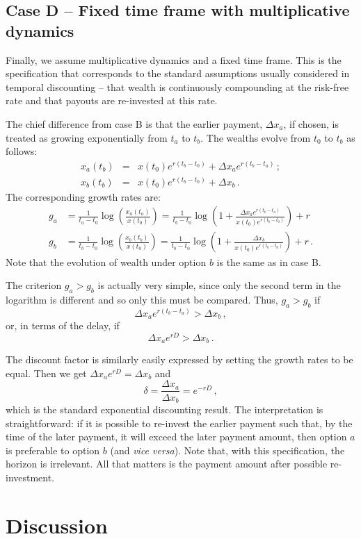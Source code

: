 \documentclass[11pt]{article}
\newcommand{\be}{\begin{equation}}
\newcommand{\ee}{\end{equation}}
\newcommand{\bea}{\begin{eqnarray}}
\newcommand{\eea}{\end{eqnarray}}
\newcommand{\Dx}{\Delta x}
\newcommand{\del}{D}
\numberwithin{equation}{section}
\begin{document}
\subsection{Case D -- Fixed time frame with multiplicative dynamics}\label{sec:case_D}

Finally, we assume multiplicative dynamics and a fixed time frame. This is the specification that corresponds to the standard assumptions usually considered in temporal discounting -- that wealth is continuously compounding at the risk-free rate and that payouts are re-invested at this rate.

The chief difference from case B is that the earlier payment, $\Dx_a$, if chosen, is treated as growing exponentially from $t_a$ to $t_b$. The wealths evolve from $t_0$ to $t_b$ as follows:
\bea
x_a\left(t_b\right) &=& x\left(t_0\right) e^{r(t_b-t_0)} + \Dx_a e^{r(t_b-t_a)}\,;\\
x_b\left(t_b\right) &=& x\left(t_0\right) e^{r(t_b-t_0)} + \Dx_b\,.
\eea
The corresponding growth rates are:
\bea
g_a &= \frac{1}{t_a-t_0} \log{\left(\frac{x_a\left(t_a\right)}{x\left(t_0\right)}\right)} = \frac{1}{t_b-t_0}\log{\left(1 + \frac{\Dx_a e^{r(t_b-t_a)}}{x\left(t_0\right)e^{r(t_b-t_0)}}\right)} + r\\
g_b &= \frac{1}{t_b-t_0} \log{\left(\frac{x_b\left(t_b\right)}{x\left(t_0\right)}\right)} = \frac{1}{t_b-t_0}\log{\left(1 + \frac{\Dx_b}{x\left(t_0\right)e^{r(t_b-t_0)}}\right)} + r\,.
\eea
Note that the evolution of wealth under option $b$ is the same as in case B.


The criterion $g_a > g_b$ is actually very simple, since only the second term in the logarithm is different and so only this must be compared. Thus, $g_a > g_b$ if
\be
\Dx_a e^{r(t_b-t_a)} > \Dx_b\,,
\ee
or, in terms of the delay, if
\be
\Dx_a e^{r\del} > \Dx_b\,.
\ee

The discount factor is similarly easily expressed by setting the growth rates to be equal. Then we get $\Dx_a e^{r\del} = \Dx_b$ and
\be
\delta = \frac{\Dx_a}{\Dx_b} = e^{-r\del}\,,
\ee
which is the standard exponential discounting result. The interpretation is straightforward: if it is possible to re-invest the earlier payment such that, by the time of the later payment, it will exceed the later payment amount, then option $a$ is preferable to option $b$ (and \textit{vice versa}). Note that, with this specification, the horizon is irrelevant. All that matters is the payment amount after possible re-investment.

\section{Discussion}\label{sec:discussion}
\end{document}
